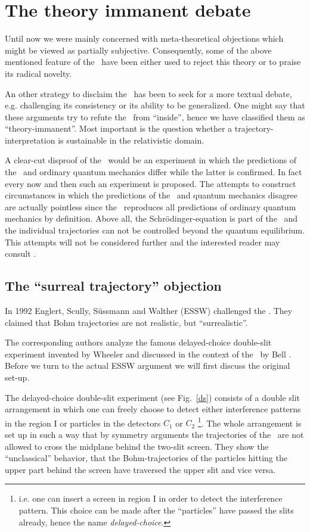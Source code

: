 \section{The theory immanent debate \label{textual}}
Until now we were mainly concerned with meta-theoretical objections which might be viewed as partially subjective. 
Consequently, some of the above mentioned feature of the \dbb\ have been either used to reject this theory or to praise 
its radical novelty.

An other strategy to disclaim the \dbb\ has been to seek for a more textual debate, e.g. 
challenging its consistency or its ability to be generalized. One might say that these arguments try to refute the \dbb\ 
from ``inside'', hence we have classified them as ``theory-immanent''. Most important is the question whether a 
trajectory-interpretation is sustainable in the relativistic domain. 

A clear-cut  disproof of the \dbb\ would be an experiment in which the 
predictions of the \dbb\ and ordinary quantum mechanics differ while the latter 
is confirmed. In fact every now and then such an experiment is proposed. 
The attempts to construct circumstances in which the predictions of the \dbb\ and 
quantum mechanics disagree are actually pointless since the \dbb\ reproduces  all predictions of ordinary quantum mechanics
by definition. Above all, the 
Schr\"odinger-equation is part of the \dbb\ and the individual trajectories can not be controlled 
beyond the quantum equilibrium. This attempts will not be 
considered further and the interested reader may consult 
\cite{pointless,pointless2,answer}. 

\subsection{The ``surreal trajectory'' objection \label{essw-d}}
In 1992 Englert, Scully, S\"ussmann and Walther (ESSW) challenged the \dbb. They claimed that  Bohm trajectories are not realistic, 
but ``surrealistic''.

The corresponding authors analyze the famous delayed-choice double-slit experiment
invented by Wheeler \cite{wheeler} and discussed in the context of the \dbb\ by Bell \cite{speakable}. 
Before we turn to the actual ESSW argument we will first discuss the original set-up.

The delayed-choice double-slit experiment (see Fig.~\ref{ds}) consists of a double slit arrangement in which 
one can freely choose to detect either interference patterns in the region I or particles in the detectors $C_1$ or 
$C_2$ \footnote{i.e. one can insert a screen in region I in order to detect the interference pattern. 
This  choice can be made after the ``particles'' have passed the slits already, hence the name {\em delayed-choice}.}.
The whole arrangement is set up in such a way that by symmetry arguments the trajectories of the \dbb\ are not allowed to cross 
the midplane behind the two-slit screen. They show the ``unclassical'' behavior, that the Bohm-trajectories of the particles hitting the 
upper part behind the screen have traversed the upper slit and vice versa. 

